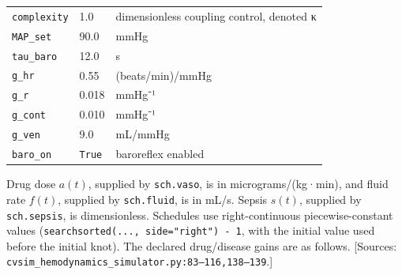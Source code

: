 \begin{center}
{\begin{tabular}{lll}
\texttt{complexity} 
& 1.0 
& dimensionless coupling control, denoted κ 
\\

\texttt{MAP\_\allowbreak{}set} 
& 90.0 
& mmHg 
\\

\texttt{tau\_\allowbreak{}baro} 
& 12.0 
& s 
\\

\texttt{g\_\allowbreak{}hr} 
& 0.55 
& (beats/min)/mmHg 
\\

\texttt{g\_\allowbreak{}r} 
& 0.018 
& mmHg⁻¹ 
\\

\texttt{g\_\allowbreak{}cont} 
& 0.010 
& mmHg⁻¹ 
\\

\texttt{g\_\allowbreak{}ven} 
& 9.0 
& mL/mmHg 
\\

\texttt{baro\_\allowbreak{}on} 
& \texttt{True} 
& baroreflex enabled 
\\

\bottomrule
\end{tabular}}
\ifdim\wd0>\textwidth\resizebox{\textwidth}{!}{\usebox0}\else\usebox0\fi
\end{center}


Drug dose \(a(t)\), supplied by \texttt{sch.\allowbreak{}vaso}, is in micrograms/(kg·min), and fluid rate \(f(t)\), supplied by \texttt{sch.\allowbreak{}fluid}, is in mL/s. Sepsis \(s(t)\), supplied by \texttt{sch.\allowbreak{}sepsis}, is dimensionless. Schedules use right-continuous piecewise-constant values (\texttt{searchsorted(.\allowbreak{}.\allowbreak{}.\allowbreak{},\allowbreak{} side=\allowbreak{}"right") - 1}, with the initial value used before the initial knot). The declared drug/disease gains are as follows. [Sources: \texttt{cvsim\_\allowbreak{}hemodynamics\_\allowbreak{}simulator.\allowbreak{}py:\allowbreak{}83–\allowbreak{}116,\allowbreak{}138–\allowbreak{}139}.]

